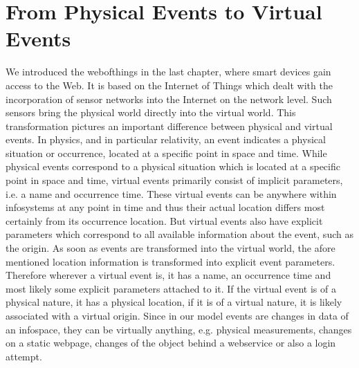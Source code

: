\section{From Physical Events to Virtual Events}
We introduced the \textrm{\gls{webofthings}} in the last chapter, where smart devices gain access to the Web.
It is based on the \textrm{Internet of Things} which dealt with the incorporation of sensor networks into the Internet on the network level.
Such sensors bring the physical world directly into the virtual world.
This transformation pictures an important difference between physical and virtual events.
In physics, and in particular relativity, an event indicates a physical situation or occurrence, located at a specific point in space and time.
While physical events correspond to a physical situation which is located at a specific point in space and time, virtual events primarily consist of implicit parameters, i.e. a name and occurrence time.
These virtual events can be anywhere within \textrm{\glspl{infosystem}} at any point in time and thus their actual location differs most certainly from its occurrence location.
But virtual events also have explicit parameters which correspond to all available information about the event, such as the origin.
As soon as events are transformed into the virtual world, the afore mentioned location information is transformed into explicit event parameters.
Therefore wherever a virtual event is, it has a name, an occurrence time and most likely some explicit parameters attached to it.
If the virtual event is of a physical nature, it has a physical location, if it is of a virtual nature, it is likely associated with a virtual origin.
Since in our model events are changes in data of an \textrm{\gls{infospace}}, they can be virtually anything, e.g. physical measurements, changes on a static webpage, changes of the object behind a \textrm{\gls{webservice}} or also a login attempt.


